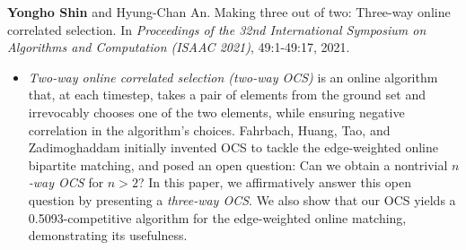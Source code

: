 \documentclass{article}
\newcommand{\killinitspace}{-0.7em}
\begin{document}
\textbf{Yongho Shin} and Hyung-Chan An. Making three out of two: Three-way online correlated selection. In \emph{Proceedings of the 32nd International Symposium on Algorithms and Computation (ISAAC 2021)}, 49:1-49:17, 2021.
\vspace{\killinitspace}
\begin{itemize}
\item \emph{Two-way online correlated selection (two-way OCS)} is an online algorithm that, at each timestep, takes a pair of elements from the ground set and irrevocably chooses one of the two elements, while ensuring negative correlation in the algorithm's choices. Fahrbach, Huang, Tao, and Zadimoghaddam initially invented OCS to tackle the edge-weighted online bipartite matching, and posed an open question: Can we obtain a nontrivial \emph{$n$-way OCS} for $n>2$? In this paper, we affirmatively answer this open question by presenting a \emph{three-way OCS}. We also show that our OCS yields a 0.5093-competitive algorithm for the edge-weighted online matching, demonstrating its usefulness.
\end{itemize}
\end{document}
